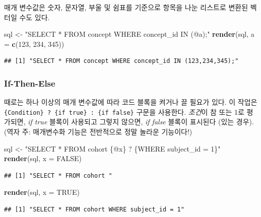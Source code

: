 \documentclass[10.5pt]{book}
\newenvironment{Shaded}{\begin{snugshade}}{\end{snugshade}}
\newcommand{\KeywordTok}[1]{\textcolor[rgb]{0.13,0.29,0.53}{\textbf{#1}}}
\newcommand{\DataTypeTok}[1]{\textcolor[rgb]{0.13,0.29,0.53}{#1}}
\newcommand{\DecValTok}[1]{\textcolor[rgb]{0.00,0.00,0.81}{#1}}
\newcommand{\StringTok}[1]{\textcolor[rgb]{0.31,0.60,0.02}{#1}}
\newcommand{\OtherTok}[1]{\textcolor[rgb]{0.56,0.35,0.01}{#1}}
\newcommand{\NormalTok}[1]{#1}
\theoremstyle{definition}
\theoremstyle{definition}
\theoremstyle{definition}
\theoremstyle{remark}
\begin{document}
매개 변수값은 숫자, 문자열, 부울 및 쉼표를 기준으로 항목을 나눈 리스트로
변환된 벡터일 수도 있다.

\begin{Shaded}
\begin{Highlighting}[]
\NormalTok{sql <-}\StringTok{ "SELECT * FROM concept WHERE concept_id IN (@a);"}
\KeywordTok{render}\NormalTok{(sql, }\DataTypeTok{a =} \KeywordTok{c}\NormalTok{(}\DecValTok{123}\NormalTok{, }\DecValTok{234}\NormalTok{, }\DecValTok{345}\NormalTok{))}
\end{Highlighting}
\end{Shaded}

\begin{verbatim}
## [1] "SELECT * FROM concept WHERE concept_id IN (123,234,345);"
\end{verbatim}

\subsubsection*{If-Then-Else}\label{if-then-else}

때로는 하나 이상의 매개 변수값에 따라 코드 블록을 켜거나 끌 필요가 있다.
이 작업은 \texttt{\{Condition\}\ ?\ \{if\ true\}\ :\ \{if\ false\}}
구문을 사용한다. \emph{조건}이 참 또는 1로 평가되면, \emph{if true}
블록이 사용되고 그렇지 않으면, \emph{if false} 블록이 표시된다 (있는
경우). (역자 주: 매개변수화 기능은 전반적으로 정말 놀라운 기능이다!)

\begin{Shaded}
\begin{Highlighting}[]
\NormalTok{sql <-}\StringTok{ "SELECT * FROM cohort \{@x\} ? \{WHERE subject_id = 1\}"}
\KeywordTok{render}\NormalTok{(sql, }\DataTypeTok{x =} \OtherTok{FALSE}\NormalTok{)}
\end{Highlighting}
\end{Shaded}

\begin{verbatim}
## [1] "SELECT * FROM cohort "
\end{verbatim}

\begin{Shaded}
\begin{Highlighting}[]
\KeywordTok{render}\NormalTok{(sql, }\DataTypeTok{x =} \OtherTok{TRUE}\NormalTok{)}
\end{Highlighting}
\end{Shaded}

\begin{verbatim}
## [1] "SELECT * FROM cohort WHERE subject_id = 1"
\end{verbatim}
\end{document}
